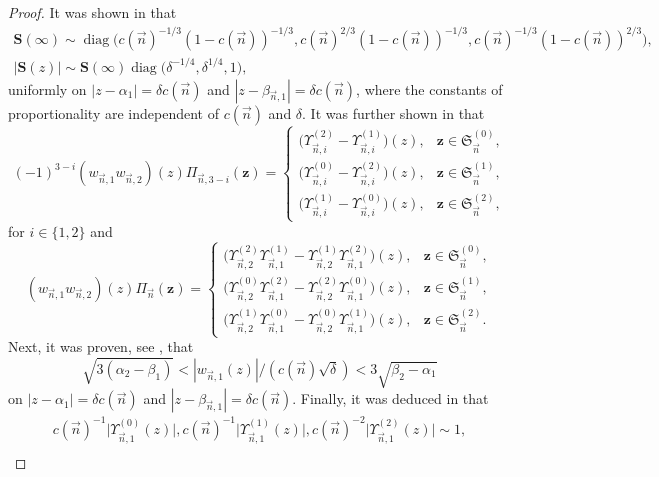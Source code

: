 \documentclass[10pt,a4paper]{amsart}
\numberwithin{equation}{section}
\newcommand{\diag}{\operatorname{diag}}
\newcommand{\n}{{\vec n}}
\newcommand{\RS}{\boldsymbol{\mathfrak{S}}}
\newcommand{\z}	{{\boldsymbol z}}
\begin{document}
\begin{proof}
It was shown in \cite[Lemma~7.3]{ApDenYa21} that
\begin{gather}
\boldsymbol S(\infty) \sim \diag\bigl(c(\n)^{-1/3}(1-c(\n))^{-1/3},c(\n)^{2/3}(1-c(\n))^{-1/3},c(\n)^{-1/3}(1-c(\n))^{2/3}\bigr),\nonumber \\
|\boldsymbol S(z)| \sim \boldsymbol S(\infty)\diag\bigl(\delta^{-1/4},\delta^{1/4},1\bigr),\label{6.2.1}
\end{gather}
uniformly on $ |z-\alpha_1| = \delta c(\n) $ and $ |z-\beta_{\n,1}| = \delta c(\n) $, where the constants of proportionality are independent of $ c(\n) $ and $ \delta $. It was further shown in \cite[Lemma~5.3]{ApDenYa21} that
\begin{equation}
\label{6.2.3}
(-1)^{3-i}(w_{\n,1}w_{\n,2})(z)\Pi_{\n,3-i}(\z) =
\begin{cases}
\bigl(\Upsilon_{\n,i}^{(2)}-\Upsilon_{\n,i}^{(1)}\bigr)(z), & \z\in\RS_\n^{(0)}, \\[1mm]
\bigl(\Upsilon_{\n,i}^{(0)}-\Upsilon_{\n,i}^{(2)}\bigr)(z), & \z\in\RS_\n^{(1)}, \\[1mm]
\bigl(\Upsilon_{\n,i}^{(1)}-\Upsilon_{\n,i}^{(0)}\bigr)(z), & \z\in\RS_\n^{(2)},
\end{cases}
\end{equation}
for $ i\in\{1,2\} $ and
\begin{equation*}
(w_{\n,1}w_{\n,2})(z)\Pi_\n(\z) =
\begin{cases}
\bigl(\Upsilon_{\n,2}^{(2)}\Upsilon_{\n,1}^{(1)}-\Upsilon_{\n,2}^{(1)}\Upsilon_{\n,1}^{(2)}\bigr)(z), & \z\in\RS_\n^{(0)}, \\[1mm]
\bigl(\Upsilon_{\n,2}^{(0)}\Upsilon_{\n,1}^{(2)}-\Upsilon_{\n,2}^{(2)}\Upsilon_{\n,1}^{(0)}\bigr)(z), & \z\in\RS_\n^{(1)}, \\[1mm]
\bigl(\Upsilon_{\n,2}^{(1)}\Upsilon_{\n,1}^{(0)}-\Upsilon_{\n,2}^{(0)}\Upsilon_{\n,1}^{(1)}\bigr)(z), & \z\in\RS_\n^{(2)}.
\end{cases}
\end{equation*}
Next, it was proven, see \cite[equation~(5.23)]{ApDenYa21}, that
\[
\sqrt{3(\alpha_2-\beta_1)} < |w_{\n,1}(z)|/ (c(\n)\sqrt\delta) < 3\sqrt{\beta_2-\alpha_1}
\]
on $ |z-\alpha_1| = \delta c(\n) $ and $ |z-\beta_{\n,1}| = \delta c(\n) $. Finally, it was deduced in \cite[Lemma~5.2]{ApDenYa21} that
\begin{gather}
c(\n)^{-1}\big|\Upsilon_{\n,1}^{(0)}(z)\big|, c(\n)^{-1}\big|\Upsilon_{\n,1}^{(1)}(z)\big|, c(\n)^{-2}\big|\Upsilon_{\n,1}^{(2)}(z)\big| \sim 1, \nonumber \\

\end{gather}
\end{proof}
\end{document}
